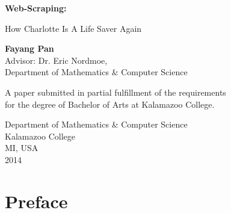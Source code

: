 \documentclass[12pt]{report}
\begin{document}
\lstset{language=Python,
basicstyle=\ttfamily,
commentstyle=\textit,
breaklines=true,
numbersep=5pt,
xleftmargin=.25in,
xrightmargin=.25in,
columns=fullflexible,
showstringspaces=false}

\begin{titlepage}
    \begin{center}
        \vspace*{1cm}
        \Huge
        \textbf{Web-Scraping:}
        
        \vspace{0.5cm}
        \Large
        How Charlotte Is A Life Saver Again
        
        \vspace{1.5cm}
        \normalsize
        \textbf{Fayang Pan}\\
        Advisor: Dr. Eric Nordmoe, \\Department of Mathematics \& Computer Science
        
        \vfill
        
        A paper submitted in partial fulfillment of the requirements \\for the degree of Bachelor of Arts at Kalamazoo College.
        
        \vspace{0.8cm}
        
        
       	Department of Mathematics \& Computer Science\\
        Kalamazoo College\\
        MI, USA\\
        2014
        
    \end{center}
\end{titlepage}
\newpage
\thispagestyle{empty}
\mbox{}

\chapter*{Preface}
\end{document}
